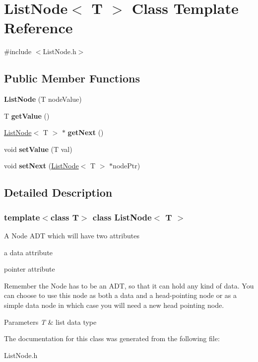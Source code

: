 \hypertarget{class_list_node}{}\section{List\+Node$<$ T $>$ Class Template Reference}
\label{class_list_node}


{\ttfamily \#include $<$List\+Node.\+h$>$}

\subsection*{Public Member Functions}
\begin{DoxyCompactItemize}
\item 
\mbox{\label{class_list_node_ab73e442b9e5e6fdd55fd14c7a286e703}} 
{\bfseries List\+Node} (T node\+Value)
\item 
\mbox{\label{class_list_node_a6293083df78a7583341575992a5c035c}} 
T {\bfseries get\+Value} ()
\item 
\mbox{\label{class_list_node_a99319bff828dc3dd174372b6aca86d3f}} 
\hyperlink{class_list_node}{List\+Node}$<$ T $>$ $\ast$ {\bfseries get\+Next} ()
\item 
\mbox{\label{class_list_node_a05c549b3db51cfbcf98f8f0edf5fe45c}} 
void {\bfseries set\+Value} (T val)
\item 
\mbox{\label{class_list_node_a56058261c0a852e3d6291e43aaf15bd4}} 
void {\bfseries set\+Next} (\hyperlink{class_list_node}{List\+Node}$<$ T $>$ $\ast$node\+Ptr)
\end{DoxyCompactItemize}


\subsection{Detailed Description}
\subsubsection*{template$<$class T$>$\newline
class List\+Node$<$ T $>$}

A Node A\+DT which will have two attributes
\begin{DoxyItemize}
\item a data attribute
\item pointer attribute
\end{DoxyItemize}Remember the Node has to be an A\+DT, so that it can hold any kind of data. You can choose to use this node as both a data and a head-\/pointing node or as a simple data node in which case you will need a new head pointing node. 
\begin{DoxyParams}{Parameters}
{\em T} & list data type \\
\hline
\end{DoxyParams}


The documentation for this class was generated from the following file\+:\begin{DoxyCompactItemize}
\item 
List\+Node.\+h\end{DoxyCompactItemize}

